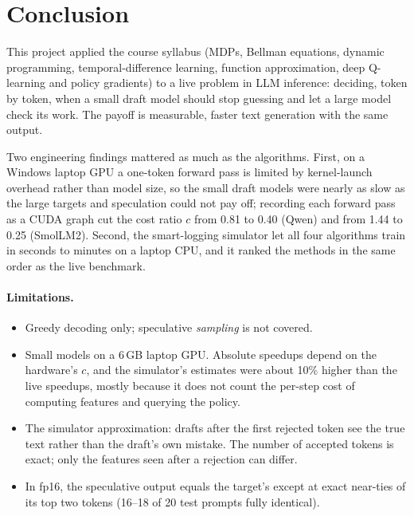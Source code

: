 \section{Conclusion}

This project applied the course syllabus (MDPs, Bellman equations, dynamic programming, temporal-difference
learning, function approximation, deep Q-learning and policy gradients) to a live problem in LLM inference:
deciding, token by token, when a small draft model should stop guessing and let a large model check its work.
The payoff is measurable, faster text generation with the same output.

\conclusionParagraph

Two engineering findings mattered as much as the algorithms. First, on a Windows laptop GPU a one-token
forward pass is limited by kernel-launch overhead rather than model size, so the small draft models were
nearly as slow as the large targets and speculation could not pay off; recording each forward pass as a CUDA
graph cut the cost ratio $c$ from 0.81 to 0.40 (Qwen) and from 1.44 to 0.25 (SmolLM2). Second, the
smart-logging simulator let all four algorithms train in seconds to minutes on a laptop CPU, and it ranked the
methods in the same order as the live benchmark.

\paragraph{Limitations.}
\begin{itemize}
  \item Greedy decoding only; speculative \emph{sampling} is not covered.
  \item Small models on a 6\,GB laptop GPU. Absolute speedups depend on the hardware's $c$, and the
  simulator's estimates were about 10\% higher than the live speedups, mostly because it does not count the
  per-step cost of computing features and querying the policy.
  \item The simulator approximation: drafts after the first rejected token see the true text rather than the
  draft's own mistake. The number of accepted tokens is exact; only the features seen after a rejection can
  differ.
  \item In fp16, the speculative output equals the target's except at exact near-ties of its top two tokens
  (16--18 of 20 test prompts fully identical).
\end{itemize}
